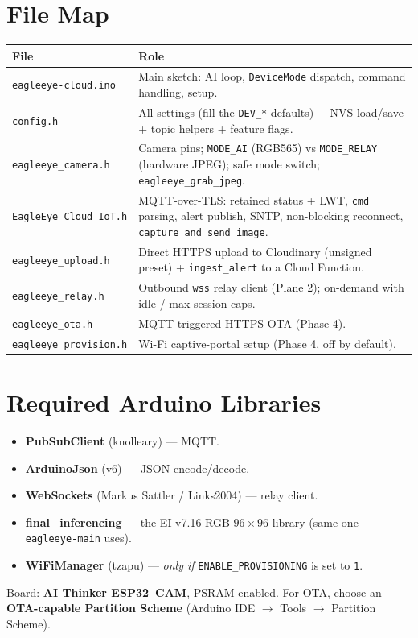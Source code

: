 \documentclass[11pt,a4paper]{article}
\newcommand{\code}[1]{\texttt{#1}}
\begin{document}
\section{File Map}
\renewcommand{\arraystretch}{1.3}
\begin{tabularx}{\linewidth}{@{}lX@{}}
\toprule
\textbf{File} & \textbf{Role} \\
\midrule
\code{eagleeye-cloud.ino}    & Main sketch: AI loop, \code{DeviceMode} dispatch, command handling, setup. \\
\code{config.h}              & All settings (fill the \code{DEV\_*} defaults) + NVS load/save + topic helpers + feature flags. \\
\code{eagleeye\_camera.h}    & Camera pins; \code{MODE\_AI} (RGB565) vs \code{MODE\_RELAY} (hardware JPEG); safe mode switch; \code{eagleeye\_grab\_jpeg}. \\
\code{EagleEye\_Cloud\_IoT.h}& MQTT-over-TLS: retained status + LWT, \code{cmd} parsing, alert publish, SNTP, non-blocking reconnect, \code{capture\_and\_send\_image}. \\
\code{eagleeye\_upload.h}    & Direct HTTPS upload to Cloudinary (unsigned preset) + \code{ingest\_alert} to a Cloud Function. \\
\code{eagleeye\_relay.h}     & Outbound \code{wss} relay client (Plane 2); on-demand with idle / max-session caps. \\
\code{eagleeye\_ota.h}       & MQTT-triggered HTTPS OTA (Phase 4). \\
\code{eagleeye\_provision.h} & Wi-Fi captive-portal setup (Phase 4, off by default). \\
\bottomrule
\end{tabularx}

\section{Required Arduino Libraries}
\begin{itemize}[nosep,leftmargin=1.4em]
  \item \textbf{PubSubClient} (knolleary) --- MQTT.
  \item \textbf{ArduinoJson} (v6) --- JSON encode/decode.
  \item \textbf{WebSockets} (Markus Sattler / Links2004) --- relay client.
  \item \textbf{final\_inferencing} --- the EI v7.16 RGB $96\times96$ library (same one \code{eagleeye-main} uses).
  \item \textbf{WiFiManager} (tzapu) --- \emph{only if} \code{ENABLE\_PROVISIONING} is set to \code{1}.
\end{itemize}
Board: \textbf{AI Thinker ESP32--CAM}, PSRAM enabled. For OTA, choose an \textbf{OTA-capable
Partition Scheme} (Arduino IDE $\rightarrow$ Tools $\rightarrow$ Partition Scheme).
\end{document}
